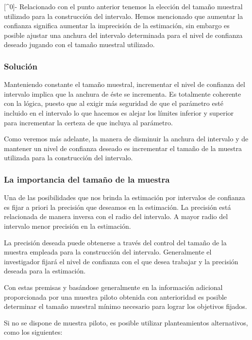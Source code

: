 \documentclass[
]{article}
\begin{document}
{[}\^{}0{]}- Relacionado con el punto anterior tenemos la elección del tamaño muestral utilizado para la construcción del intervalo. Hemos mencionado que aumentar la confianza significa aumentar la imprecisión de la estimación, sin embargo es posible ajustar una anchura del intervalo determinada para el nivel de confianza deseado jugando con el tamaño muestral utilizado.

\subsubsection{Solución}\label{soluciuxf3n-1}

Manteniendo constante el tamaño muestral, incrementar el nivel de confianza del intervalo implica que la anchura de éste se incrementa. Es totalmente coherente con la lógica, puesto que al exigir más seguridad de que el parámetro esté incluido en el intervalo lo que hacemos es alejar los límites inferior y superior para incrementar la certeza de que incluya al parámetro.

Como veremos más adelante, la manera de disminuir la anchura del intervalo y de mantener un nivel de confianza deseado es incrementar el tamaño de la muestra utilizada para la construcción del intervalo.

\subsubsection{La importancia del tamaño de la muestra}\label{la-importancia-del-tamauxf1o-de-la-muestra}

Una de las posibilidades que nos brinda la estimación por intervalos de confianza es fijar a priori la precisión que deseamos en la estimación. La precisión está relacionada de manera inversa con el radio del intervalo. A mayor radio del intervalo menor precisión en la estimación.

La precisión deseada puede obtenerse a través del control del tamaño de la muestra empleada para la construcción del intervalo. Generalmente el investigador fijará el nivel de confianza con el que desea trabajar y la precisión deseada para la estimación.

Con estas premisas y basándose generalmente en la información adicional proporcionada por una muestra piloto obtenida con anterioridad es posible determinar el tamaño muestral mínimo necesario para lograr los objetivos fijados.

Si no se dispone de muestra piloto, es posible utilizar planteamientos alternativos, como los siguientes:
\end{document}
